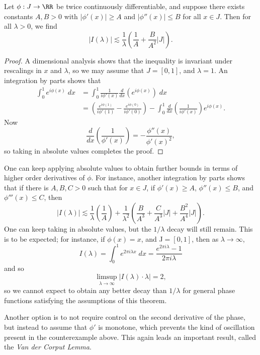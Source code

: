\begin{theorem}
  Let $\phi: J \to \RR$ be twice continuously differentiable, and suppose there exists constants $A,B > 0$ with $|\phi'(x)| \geq A$ and $|\phi''(x)| \leq B$ for all $x \in J$. Then for all $\lambda > 0$, we find
  \[ |I(\lambda)| \lesssim \frac{1}{\lambda} \left( \frac{1}{A} + \frac{B}{A^2} |J| \right). \]
\end{theorem}
\begin{proof}
  A dimensional analysis shows that the inequality is invariant under rescalings in $x$ and $\lambda$, so we may assume that $J = [0,1]$, and $\lambda = 1$. An integration by parts shows that
  \begin{align*}
    \int_0^1 e^{i \phi(x)}\; dx &= \int_0^1 \frac{1}{i \phi'(x)} \frac{d}{dx} \left( e^{i \phi(x)} \right)\; dx\\
    &= \left( \frac{e^{i \phi(1)}}{i \phi'(1)} - \frac{e^{i \phi(0)}}{i \phi'(0)} \right) - \int_0^1 \frac{d}{dx} \left( \frac{1}{i \phi'(x)} \right) e^{i \phi(x)}.
  \end{align*}
  Now
  \[ \frac{d}{dx} \left( \frac{1}{\phi'(x)} \right) = - \frac{\phi''(x)}{\phi'(x)^2}, \]
  so taking in absolute values completes the proof.
\end{proof}

One can keep applying absolute values to obtain further bounds in terms of higher order derivatives of $\phi$. For instance, another integration by parts shows that if there is $A,B,C > 0$ such that for $x \in J$, if $\phi'(x) \geq A$, $\phi''(x) \leq B$, and $\phi'''(x) \leq C$, then
%
\[ |I(\lambda)| \lesssim \frac{1}{\lambda} \left( \frac{1}{A} \right) + \frac{1}{\lambda^2} \left( \frac{B}{A^3} + \frac{C}{A^3} |J| + \frac{B^2}{A^4} |J| \right). \]
%
One can keep taking in absolute values, but the $1/\lambda$ decay will still remain. This is to be expected; for instance, if $\phi(x) = x$, and J$ = [0,1]$, then as $\lambda \to \infty$,
%
\[ I(\lambda) = \int_0^1 e^{2 \pi i \lambda x}\; dx = \frac{e^{2 \pi i \lambda} - 1}{2 \pi i \lambda} \]
%
and so
%
\[ \limsup_{\lambda \to \infty} |I(\lambda) \cdot \lambda| = 2, \]
%
so we cannot expect to obtain any better decay than $1/\lambda$ for general phase functions satisfying the assumptions of this theorem.

Another option is to not require control on the second derivative of the phase, but instead to assume that $\phi'$ is monotone, which prevents the kind of oscillation present in the counterexample above. This again leads an important result, called the \emph{Van der Corput Lemma}.

